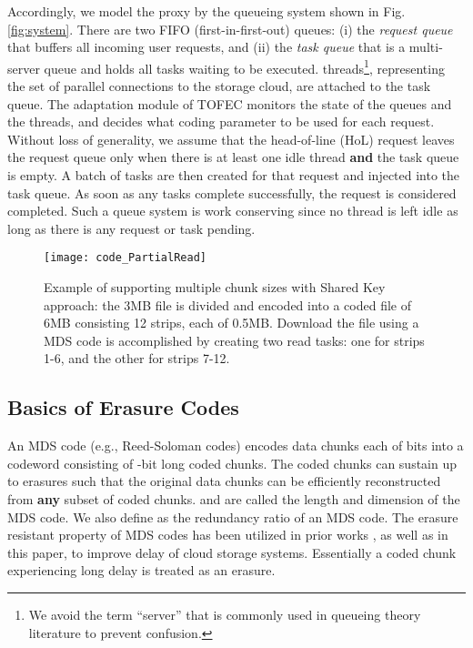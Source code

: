 \documentclass[journal]{IEEEtran}
\newcommand{\ourproposal}{TOFEC\xspace}
\begin{document}
Accordingly, we model the proxy by the queueing system shown in Fig.\ref{fig:system}. There are two FIFO (first-in-first-out) queues: (i) the {\em request queue} that buffers all incoming user requests, and (ii) the {\em task queue} that is a multi-server queue and holds all tasks waiting to be executed.  threads\footnote{We avoid the term ``server'' that is commonly used in queueing theory literature to prevent confusion.}, representing the set of parallel connections to the storage cloud, are attached to the task queue. 
The adaptation module of \ourproposal monitors the state of the queues and the threads, and decides what coding parameter  to be used for each request. 
Without loss of generality, we assume that the head-of-line (HoL) request leaves the request queue only when there is at least one idle thread {\bf and} the task queue is empty. A batch of  tasks are then created for that request and injected into the task queue. As soon as any  tasks complete successfully, the request is considered completed.  Such a queue system is work conserving since no thread is left idle as long as there is any request or task pending. 


\begin{figure}[t]
\centering
\texttt{[image: code\_PartialRead]}
\caption{Example of supporting multiple chunk sizes with Shared Key approach: the 3MB file is divided and encoded into a coded file of 6MB consisting 12 strips, each of 0.5MB. Download the file using a  MDS code is accomplished by creating two read tasks: one for strips 1-6, and the other for strips 7-12.} 
\label{fig:partialRead}
\end{figure}

\subsection{Basics of Erasure Codes}
\label{ssec:model:code}
An  MDS code (e.g., Reed-Soloman codes) encodes  data chunks each of  bits into a codeword consisting of  -bit long coded chunks. The coded chunks can sustain up to  erasures such that the  original data chunks can be efficiently reconstructed from {\bf any} subset of  coded chunks.
 and  are called the length and dimension of the MDS code. We also define  as the redundancy ratio of an  MDS code. The erasure resistant property of MDS codes has been utilized in prior works \cite{fastcloud,Longbocodeingincloud, MDS-queue}, as well as in this paper, to improve delay of cloud storage systems. Essentially a coded chunk experiencing long delay is treated as an erasure. 
\end{document}
